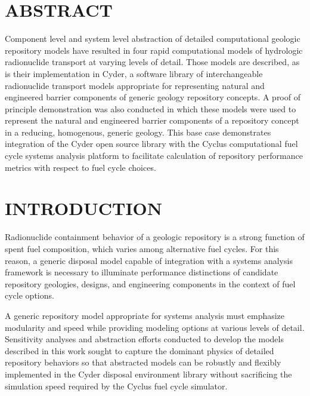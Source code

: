 \documentclass[letterpaper]{article}
\begin{document}
\section*{ABSTRACT}

Component level and system level abstraction of detailed computational geologic 
repository models have resulted in four rapid computational models of hydrologic 
radionuclide transport at varying levels of detail. Those models are described, 
as is their implementation in Cyder, a software library of 
interchangeable radionuclide transport models appropriate for representing 
natural and engineered barrier components of generic geology repository 
concepts. A proof of principle demonstration was also conducted in which these models 
were used to represent the natural and engineered barrier components of a 
repository concept in a reducing, homogenous, generic geology. 
This base case demonstrates integration of the Cyder open source library with the Cyclus 
computational fuel cycle systems analysis platform to facilitate calculation of
repository performance metrics with respect to fuel cycle choices.

\section*{INTRODUCTION}
Radionuclide containment behavior of a geologic repository is a strong function 
of spent fuel composition, which varies among alternative fuel cycles. For this 
reason, a generic disposal model capable of integration with a systems analysis 
framework is necessary to illuminate performance distinctions of candidate 
repository geologies, designs, and engineering components in the context of fuel 
cycle options. 

A generic repository model appropriate for systems analysis must emphasize 
modularity and speed while providing modeling options at various levels of 
detail. Sensitivity analyses and abstraction efforts conducted to develop the 
models described in this work sought to capture the dominant physics of detailed 
repository behaviors so that abstracted models can be robustly and flexibly 
implemented in the Cyder disposal environment library without sacrificing the 
simulation speed required by the Cyclus fuel cycle simulator.
\end{document}

